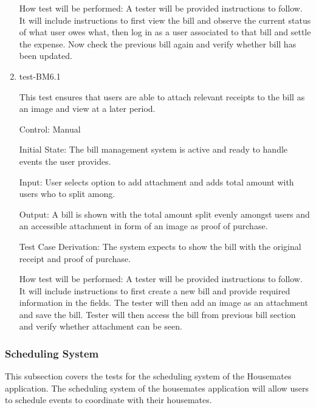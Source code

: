 \documentclass[12pt, titlepage]{article}
\begin{document}
\begin{enumerate}
How test will be performed: A tester will be provided instructions to follow. It will include instructions to first view the bill and observe the current status of what user owes what, then log in as a user associated to that bill and settle the expense. Now check the previous bill again and verify whether bill has been updated.

\item{test-BM6.1\\}

This test ensures that users are able to attach relevant receipts to the bill as an image and view at a later period.

Control: Manual
					
Initial State: The bill management system is active and ready to handle events the user provides.
					
Input: User selects option to add attachment and adds total amount with users who to split among.
					
Output: A bill is shown with the total amount split evenly amongst users and an accessible attachment in form of an image as proof of purchase.

Test Case Derivation: The system expects to show the bill with the original receipt and proof of purchase.

How test will be performed: A tester will be provided instructions to follow. It will include instructions to first create a new bill and provide required information in the fields. The tester will then add an image as an attachment and save the bill. Tester will then access the bill from previous bill section and verify whether attachment can be seen. 

\end{enumerate}

\subsubsection{Scheduling  System}

This subsection covers the tests for the scheduling system of the Housemates application. The scheduling system of the housemates application will allow users to schedule events to coordinate with their housemates.
\end{document}
